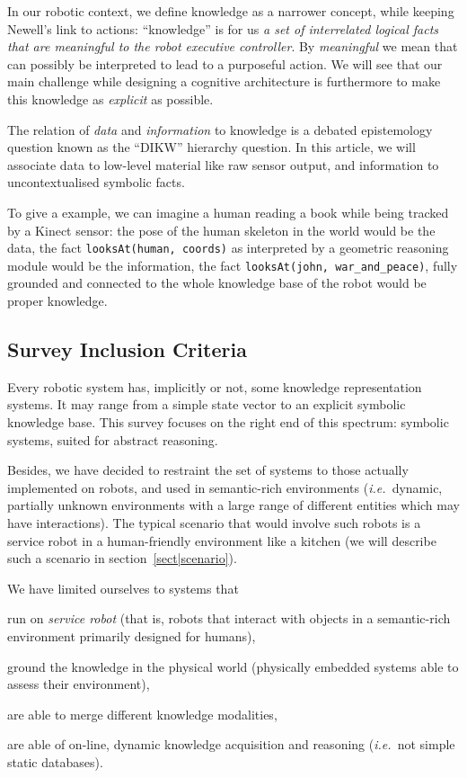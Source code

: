 \documentclass{IEEEtran}
\newcommand{\ie}{{\textit{i.e.\ }}}
\newcommand{\concept}[1]{{\footnotesize \texttt{#1}}}
\begin{document}
In our robotic context, we define knowledge as a narrower concept, while
keeping Newell's link to actions: ``knowledge'' is for us  \emph{a set of
interrelated logical facts that are meaningful to the robot executive
controller}. By \emph{meaningful} we mean that can possibly be interpreted to
lead to a purposeful action. We will see that our main challenge while
designing a cognitive architecture is furthermore to make this knowledge as
\emph{explicit} as possible.

The relation of \emph{data} and \emph{information} to knowledge is a debated
epistemology question known as the ``DIKW'' hierarchy question. In this article,
we will associate data to low-level material like raw sensor output, and
information to uncontextualised symbolic facts.

To give a example, we can imagine a human reading a book while being tracked by
a Kinect sensor: the pose of the human skeleton in the world would be the data,
the fact \concept{looksAt(human, coords)} as interpreted by a geometric reasoning
module would be the information, the fact \concept{looksAt(john,
war\_and\_peace)}, fully grounded and connected to the whole knowledge base of
the robot would be proper knowledge.

\subsection*{Survey Inclusion Criteria}
\label{sect|inclusion-criteria}

Every robotic system has, implicitly or not, some knowledge representation
systems. It may range from a simple state vector to an explicit symbolic
knowledge base.  This survey focuses on the right end of this spectrum:
symbolic systems, suited for abstract reasoning.

Besides, we have decided to restraint the set of systems to those actually
implemented on robots, and used in semantic-rich environments (\ie dynamic,
partially unknown environments with a large range of different entities which
may have interactions). The typical scenario that would involve such robots is
a service robot in a human-friendly environment like a kitchen (we will
describe such a scenario in section~\ref{sect|scenario}).

We have limited ourselves to systems that
\begin{inparaenum} 
    \item  run on \emph{service robot} (that is, robots that interact with 
    objects in a semantic-rich environment primarily designed for humans),
    \item  ground the knowledge in the physical world (physically embedded
    systems able to assess their environment),
    \item  are able to merge different knowledge modalities,
    \item  are able of on-line, dynamic knowledge acquisition and reasoning 
    (\ie not simple static databases).
\end{inparaenum}
\end{document}
